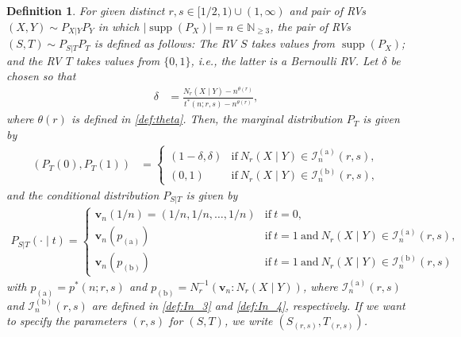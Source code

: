 \documentclass[conference, draftcls, onecolumn]{IEEEtran}
\theoremstyle{plain}
\newtheorem{definition}{Definition}
\newcommand{\bvec}[1]{\boldsymbol{#1}}
\newcommand{\supp}{\operatorname{supp}}
\begin{document}
\begin{definition}
\label{def:ST}
For given distinct $r, s \in [1/2, 1) \cup (1, \infty)$ and pair of RVs $(X, Y) \sim P_{X|Y} P_{Y}$ in which $|\!\supp( P_{X} )| = n \in \mathbb{N}_{\ge 3}$, the pair of RVs $(S, T) \sim P_{S|T} P_{T}$ is defined as follows:
The RV $S$ takes values from $\supp( P_{X} )$; and the RV $T$ takes values from $\{ 0, 1 \}$, i.e., the latter is a Bernoulli RV.
Let $\delta$ be chosen so that
\begin{align}
\delta
& =
\frac{ N_{r}(X \mid Y) - n^{\theta( r )} }{ t^{\ast}(n; r, s) - n^{\theta( r )} } ,
\label{def:delta}
\end{align}
where $\theta( r )$ is defined in \eqref{def:theta}.
Then, the marginal distribution $P_{T}$ is given by
\begin{align}
( P_{T}( 0 ), P_{T}( 1 ) )
& =
\begin{cases}
(1 - \delta, \delta)
& \mathrm{if} \ N_{r}(X \mid Y) \in \mathcal{I}_{n}^{(\mathrm{a})}( r, s ) ,
\\
(0, 1)
& \mathrm{if} \ N_{r}(X \mid Y) \in \mathcal{I}_{n}^{(\mathrm{b})}( r, s ) ,
\end{cases}
\label{def:marginal_T}
\end{align}
and the conditional distribution $P_{S|T}$ is given by
\begin{align}
P_{S|T}(\cdot \mid t)
=
\begin{cases}
\bvec{v}_{n}( 1/n ) = (1/n, 1/n, \dots, 1/n)
& \mathrm{if} \ t = 0 ,
\\
\bvec{v}_{n}( p_{(\mathrm{a})} )
& \mathrm{if} \ t = 1 \ \mathrm{and} \ N_{r}(X \mid Y) \in \mathcal{I}_{n}^{(\mathrm{a})}( r, s ) ,
\\
\bvec{v}_{n}( p_{(\mathrm{b})} )
& \mathrm{if} \ t = 1 \ \mathrm{and} \ N_{r}(X \mid Y) \in \mathcal{I}_{n}^{(\mathrm{b})}( r, s )
\end{cases}
\label{def:cond_ST}
\end{align}
with $p_{(\mathrm{a})} = p^{\ast}(n; r, s)$ and $p_{(\mathrm{b})} = N_{r}^{-1}( \bvec{v}_{n} : N_{r}(X \mid Y) )$, where $\mathcal{I}_{n}^{(\mathrm{a})}( r, s )$ and $\mathcal{I}_{n}^{(\mathrm{b})}( r, s )$ are defined in \eqref{def:In_3} and \eqref{def:In_4}, respectively.
If we want to specify the parameters $(r, s)$ for $(S, T)$, we write $(S_{(r, s)}, T_{(r, s)})$.
\end{definition}
\end{document}
